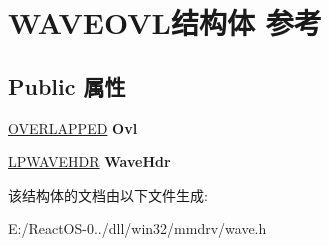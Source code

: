 \hypertarget{struct_w_a_v_e_o_v_l}{}\section{W\+A\+V\+E\+O\+V\+L结构体 参考}
\label{struct_w_a_v_e_o_v_l}
\subsection*{Public 属性}
\begin{DoxyCompactItemize}
\item 
\mbox{\label{struct_w_a_v_e_o_v_l_a0e9f45b4dc2cc72df2f616ec7be252c0}} 
\hyperlink{struct___o_v_e_r_l_a_p_p_e_d}{O\+V\+E\+R\+L\+A\+P\+P\+ED} {\bfseries Ovl}
\item 
\mbox{\label{struct_w_a_v_e_o_v_l_a48b0c1cc03a3eb7f81109caf233f0551}} 
\hyperlink{structwavehdr__tag}{L\+P\+W\+A\+V\+E\+H\+DR} {\bfseries Wave\+Hdr}
\end{DoxyCompactItemize}


该结构体的文档由以下文件生成\+:\begin{DoxyCompactItemize}
\item 
E\+:/\+React\+O\+S-\/0../dll/win32/mmdrv/wave.\+h\end{DoxyCompactItemize}
